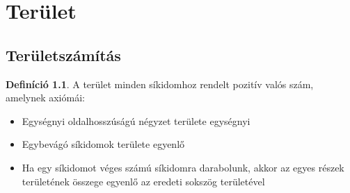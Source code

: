 \documentclass[twoside,12pt]{report}
\theoremstyle{definition}
\newtheorem{definition}[theorem]{Definíció}
\begin{document}
\chapter{Terület}
\section{Területszámítás}
	\begin{definition}
		A terület minden síkidomhoz rendelt pozitív valós szám, amelynek axiómái:
		\begin{itemize}
			\item Egységnyi oldalhosszúságú négyzet területe egységnyi
			\item Egybevágó síkidomok területe egyenlő
			\item Ha egy síkidomot véges számú síkidomra darabolunk, akkor az egyes részek területének összege egyenlő az eredeti sokszög területével
		\end{itemize}
	\end{definition}
\end{document}
